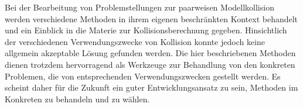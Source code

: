 
Bei der Bearbeitung von Problemstellungen zur paarweisen Modellkollision werden verschiedene Methoden in ihrem eigenen beschränkten Kontext behandelt und ein Einblick in die Materie zur Kollisionsberechnung gegeben. Hinsichtlich der verschiedenen Verwendungszwecke von Kollision konnte jedoch keine allgemein akzeptable Lösung gefunden werden. Die hier beschriebenen Methoden dienen trotzdem hervorragend als Werkzeuge zur Behandlung von den konkreten Problemen, die von entsprechenden Verwendungszwecken gestellt werden. Es scheint daher für die Zukunft ein guter Entwicklungsansatz zu sein, Methoden im Konkreten zu behandeln und zu wählen.\\
